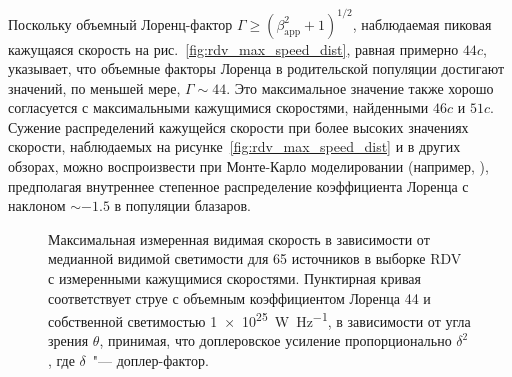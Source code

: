 Поскольку объемный Лоренц-фактор $\Gamma\ge (\beta_\mathrm{app}^{2}+1)^{1/2}$, наблюдаемая пиковая
кажущаяся скорость на рис.~\ref{fig:rdv_max_speed_dist}, равная примерно $44c$, указывает, что
объемные факторы Лоренца в родительской популяции достигают значений, по меньшей мере,
$\Gamma\sim44$. Это максимальное значение также хорошо согласуется с максимальными кажущимися
скоростями, найденными \cite{Jorstad_2005} $46c$ и \cite{Lister_2009b} $51c$. Сужение распределений
кажущейся скорости при более высоких значениях скорости, наблюдаемых на
рисунке~\ref{fig:rdv_max_speed_dist} и в других обзорах, можно воспроизвести при Монте-Карло
моделировании (например, \cite{Lister_1997,Lister_2009b}), предполагая внутреннее степенное
распределение коэффициента Лоренца с наклоном $\sim-1.5$ в популяции блазаров.

\begin{figure}[tbh]
 \caption{Максимальная измеренная видимая скорость в зависимости от медианной видимой светимости
для 65 источников в выборке RDV с измеренными кажущимися скоростями. Пунктирная кривая
соответствует струе с объемным коэффициентом Лоренца 44 и собственной светимостью
\SI{1e25}{\watt\per\hertz}, в зависимости от угла зрения $\theta$, принимая, что доплеровское
усиление пропорционально $\delta^2$, где $\delta$~"--- доплер-фактор.}
 \label{fig:rdv_speed_vs_lum}
\end{figure}

